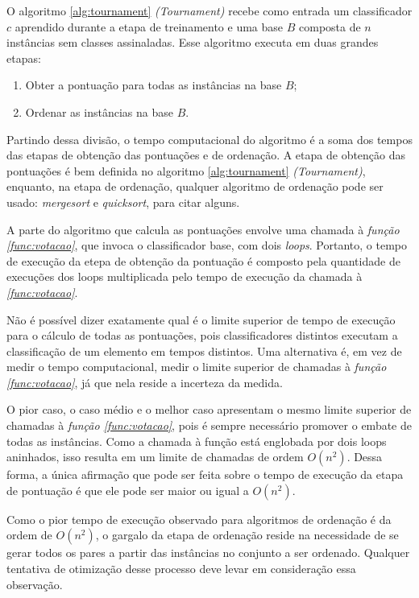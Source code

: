 O algoritmo \ref{alg:tournament} \emph{(Tournament)} recebe como entrada um classificador $c$ aprendido durante a etapa de treinamento e uma base $B$ composta de $n$ instâncias sem classes assinaladas. Esse algoritmo executa em duas grandes etapas:

\begin{enumerate}
    \item Obter a pontuação para todas as instâncias na base $B$;
    \item Ordenar as instâncias na base $B$.
\end{enumerate}

Partindo dessa divisão, o tempo computacional do algoritmo é a soma dos tempos das etapas de obtenção das pontuações e de ordenação. A etapa de obtenção das pontuações é bem definida no algoritmo \ref{alg:tournament} \emph{(Tournament)}, enquanto, na etapa de ordenação, qualquer algoritmo de ordenação pode ser usado: \emph{mergesort} e \emph{quicksort}, para citar alguns.

A parte do algoritmo que calcula as pontuações envolve uma chamada à \emph{função \ref{func:votacao}}, que invoca o classificador base, com dois \emph{loops}. Portanto, o tempo de execução da etepa de obtenção da pontuação é composto pela quantidade de execuções dos loops multiplicada pelo tempo de execução da chamada à \emph{\ref{func:votacao}}.

Não é possível dizer exatamente qual é o limite superior de tempo de execução para o cálculo de todas as pontuações, pois classificadores distintos executam a classificação de um elemento em tempos distintos. Uma alternativa é, em vez de medir o tempo computacional, medir o limite superior de chamadas à \emph{função \ref{func:votacao}}, já que nela reside a incerteza da medida.

O pior caso, o caso médio e o melhor caso apresentam o mesmo limite superior de chamadas à \emph{função \ref{func:votacao}}, pois é sempre necessário promover o embate de todas as instâncias. Como a chamada à função está englobada por dois loops aninhados, isso resulta em um limite de chamadas de ordem $O(n^2)$. Dessa forma, a única afirmação que pode ser feita sobre o tempo de execução da etapa de pontuação é que ele pode ser maior ou igual a $O(n^2)$.

Como o pior tempo de execução observado para algoritmos de ordenação é da ordem de $O(n^2)$, o gargalo da etapa de ordenação reside na necessidade de se gerar todos os pares a partir das instâncias no conjunto a ser ordenado. Qualquer tentativa de otimização desse processo deve levar em consideração essa observação.


